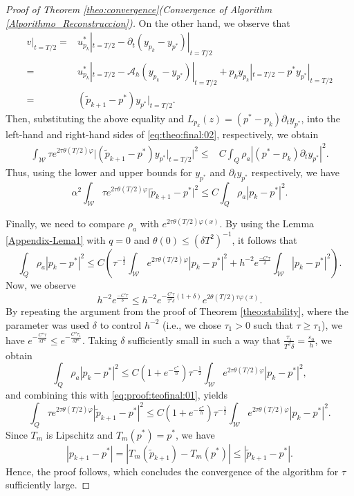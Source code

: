 \documentclass{amsart}
\numberwithin{equation}{section}
\begin{document}
\begin{proof}[Proof of Theorem \ref{theo:convergence}(Convergence of Algorithm \eqref{Alporithmo_Reconstruccion})]
On the other hand, we observe that 
\begin{align*}
    v|_{t=T/2}=&u^\ast_{p_k}|_{t=T/2}-\partial_t(y_{p_k}-y_{p^\ast})|_{t=T/2}\\
    =& u^\ast_{p_k}|_{t=T/2}-\mathcal{A}_h(y_{p_k}-y_{p^\ast})|_{t=T/2}+p_ky_{p_k}|_{t=T/2}-p^\ast y_{p^\ast}|_{t=T/2}\\
    =&(\tilde{p}_{k+1}-p^\ast)y_{p^\ast}|_{t=T/2}.
\end{align*}
Then, substituting the above equality and $L_{p_k}(z)=(p^\ast-p_k)\partial_t y_{p^\ast}$, into the left-hand and right-hand sides of \eqref{eq:theo:final:02}, respectively, we obtain
\begin{align}
		\int_{\mathcal{W}}\tau e^{2\tau\theta(T/2)\varphi}\Big|(\tilde{p}_{k+1}-p^\ast)y_{p^\ast}|_{t=T/2}\Big|^2
		\leq&  C\int_Q\rho_a |(p^\ast-p_k)\partial_t y_{p^\ast}|^2.
	\end{align}
Thus, using the lower and upper bounds for $y_{p^{\ast}}$ and $\partial_{t}y_{p^{\ast}}$ respectively, we have 
\begin{equation}\label{eq:proof:teofinal:01}
    \alpha^2 \int_{\mathcal{W}}\tau e^{2\tau\theta(T/2)\varphi}\Big|\tilde{p}_{k+1}-p^\ast\Big|^2
		\leq  C\int_Q\rho_a |p_k-p^\ast|^2.
\end{equation}

Finally, we need to compare $\rho_a$ with $e^{2\tau\theta(T/2)\varphi(x)}$. By using the Lemma \ref{Appendix-Lema1} with $q=0$ and $\theta(0)\leq (\delta T^2)^{-1}$, it follows that 
$$\int_Q\rho_a |p_k-p^\ast|^2
\leq C\left(\tau^{-\frac{1}{2}}\int_{\mathcal{W}}e^{2\tau\theta(T/2)\varphi} |p_k-p^\ast|^2+h^{-2}e^{\frac{-C'\tau}{\delta}}\int_{\mathcal{W}} |p_k-p^\ast|^2\right).$$
Now, we observe 
$$h^{-2}e^{\frac{-C'\tau}{\delta}}
\leq h^{-2}e^{-\frac{C'\tau}{T^2\delta}(1+\delta)}e^{2\theta(T/2)\tau\varphi(x)}.$$
By repeating the argument from the proof of Theorem \ref{theo:stability}, where the parameter was used $\delta$ to control $h^{-2}$  (i.e., we chose $\tau_1>0$ such that $\tau\geq \tau_1$), we have $e^{-\frac{C''\tau}{\delta T^{2}}}\leq e^{-\frac{C''\tau_1}{\delta T^{2}}}$. Taking $\delta$ sufficiently small in such a way that $\frac{\tau_1}{T^{2}\delta}=\frac{\varepsilon_{0}}{h}$, we obtain
$$\int_Q\rho_a |p_k-p^\ast|^2
\leq C(1+e^{-\frac{c''}{h}})\tau^{-\frac{1}{2}}\int_{\mathcal{W}}e^{2\tau\theta(T/2)\varphi} |p_k-p^\ast|^2,$$
and combining this with \eqref{eq:proof:teofinal:01}, yields
$$\int_Q \tau e^{2\tau\theta(T/2)\varphi} |\tilde{p}_{k+1}-p^\ast|^2
\leq C(1+e^{-\frac{c''}{h}})\tau^{-\frac{1}{2}}\int_{\mathcal{W}}e^{2\tau\theta(T/2)\varphi} |p_k-p^\ast|^2.$$
Since $T_m$ is Lipschitz and $T_m(p^\ast)=p^\ast$, we have $$|p_{k+1}-p^\ast|=|T_m(\tilde{p}_{k+1})-T_m(p^\ast)|\leq |\tilde{p}_{k+1}-p^\ast|.$$
Hence, the proof follows, which concludes the convergence of the algorithm for $\tau$ sufficiently large.
\end{proof}
\end{document}
